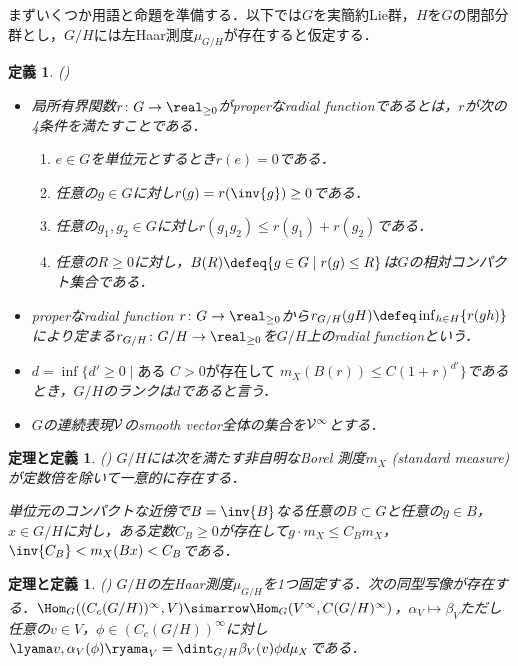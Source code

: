 \documentclass[12pt,dvipdfmx,uplatex]{jsarticle}
\newcounter{countabst}
\newtheorem{thmdef-a}[countabst]{定理と定義}
\newtheorem{def-a}[countabst]{定義}
\begin{document}
まずいくつか用語と命題を準備する．以下では$G$を実簡約Lie群，$H$を$G$の閉部分群とし，$G/H$には左Haar測度$\mu_{G/H} $が存在すると仮定する．
\begin{def-a}(\cite{ber88})
  \leavevmode\vspace{-1em}
  \begin{itemize}
  \item 局所有界関数$r\colon G\to \real_{\geq 0} $がproperなradial functionであるとは，$r$が次の4条件を満たすことである．
    \begin{enumerate}
    \item $e\in G$を単位元とするとき$r(e) = 0 $である．
    \item 任意の$g\in G$に対し$r(g) = r(\inv{g})\geq 0  $である．
    \item 任意の$g_1,g_2\in G$に対し$r(g_1g_2)\leq r(g_1) + r(g_2)  $である．
    \item 任意の$R\geq 0$に対し，$B(R)\defeq \{g\in G\mid r(g)\leq R \} $は$G$の相対コンパクト集合である．
    \end{enumerate}
  \item properなradial function $r\colon G\to \real_{\geq 0} $から$r_{G/H}(gH)\defeq \inf_{h\in H}\{r(gh) \}$により定まる${r_{G/H}\colon G/H\to \real_{\geq 0}}$を$G/H$上のradial functionという．
  \item $d = \inf\{d'\geq 0\mid \text{ある } C > 0\text{が存在して }  m_X(B(r))\leq C(1+r)^{d'}\} $であるとき，$G/H$のランクは$d$であると言う．
  \item $G$の連続表現$\cal{V} $のsmooth vector全体の集合を$\cal{V}^{\infty} $とする．
  \end{itemize}
\end{def-a}
\begin{thmdef-a}(\cite[p.~683]{ber88})
  $G/H$には次を満たす非自明なBorel 測度$m_X $ (standard measure) が定数倍を除いて一意的に存在する．

  単位元のコンパクトな近傍で$B = \inv{B} $なる任意の$B\subset G$と任意の$g\in B$，$x\in G/H$に対し，ある定数$C_B\geq 0 $が存在して$g\cdot m_X \leq C_B m_X$，$ \inv{C_B} < m_X(Bx) < C_{B}$である．
\end{thmdef-a}
\begin{thmdef-a}(\cite[p.~678]{ber88})
  $G/H$の左Haar測度$\mu_{G/H} $を1つ固定する．次の同型写像が存在する．$\Hom_{G}((C_c(G/H))^{\infty}, V )\simarrow \Hom_{G}(V^{\infty}, C(G/H)^{\infty}) $，$\alpha_V\mapsto \beta_V$ただし任意の$v\in V$，$\phi \in  (C_c(G/H))^{\infty} $に対し$ \lyama v,\alpha_V(\phi)\ryama_{V} = \dint_{G/H}\beta_V(v)\phi d\mu_X  $である．
\end{thmdef-a}
\end{document}
